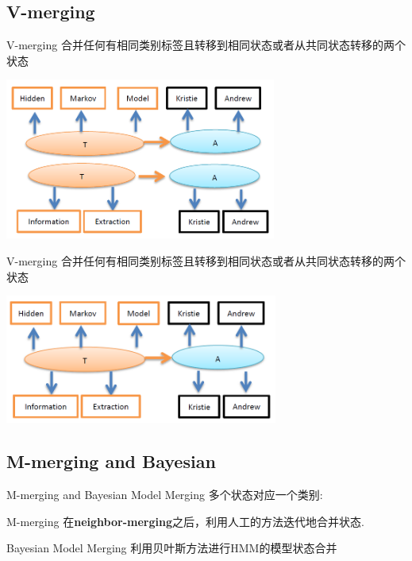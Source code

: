 \documentclass{beamer}
\begin{document}
\subsection{V-merging}
\begin{frame}{V-merging}
    合并任何有相同类别标签且转移到相同状态或者从共同状态转移的两个状态
    \begin{center}
        \includegraphics[height=150pt]{report5/v-merge-1.png}
    \end{center}
\end{frame}

\begin{frame}{V-merging}
    合并任何有相同类别标签且转移到相同状态或者从共同状态转移的两个状态
    \begin{center}
        \includegraphics[height=120pt]{report5/v-merge-2.png}
    \end{center}
\end{frame}

\subsection{M-merging and Bayesian}
\begin{frame}{M-merging and Bayesian Model Merging}
多个状态对应一个类别:
\begin{block}{M-merging}
    在\textbf{neighbor-merging}之后，利用人工的方法迭代地合并状态.    
\end{block}

\begin{block}{Bayesian Model Merging}
    利用贝叶斯方法进行HMM的模型状态合并
\end{block}
\end{frame}
\end{document}
